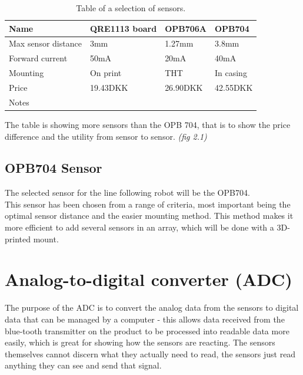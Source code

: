 \begin{table}[htbp]
    \begin{tabular}{|l|l|l|l|}
        \hline
        Name                & QRE1113 board & OPB706A  & OPB704    \\ \hline
        Max sensor distance & 3mm                            & 1.27mm   & 3.8mm     \\ \hline
        Forward current     & 50mA                           & 20mA     & 40mA      \\ \hline
        Mounting            & On print                       & THT      & In casing \\ \hline
        Price               & 19.43DKK                       & 26.90DKK & 42.55DKK  \\ \hline
        Notes               & ~                              & ~        & ~         \\
        \hline
    \end{tabular}
    \caption{Table of a selection of sensors.}
\label{sensor_table}
\end{table}
The table is showing more sensors than the OPB 704, that is to show the price difference and the utility from sensor to sensor. \emph{(fig 2.1)}



\subsection{OPB704 Sensor}
The selected sensor for the line following robot will be the OPB704.\\
This sensor has been chosen from a range of criteria, most important being the optimal sensor distance and the easier mounting method. This method makes it more efficient to add several sensors in an array, which will be done with a 3D-printed mount. 



\section{Analog-to-digital converter (ADC)}

The purpose of the ADC is to convert the analog data from the sensors to digital data that can be managed by a computer - this allows data received from the blue-tooth transmitter on the product to be processed into readable data more easily, which is great for showing how the sensors are reacting. The sensors themselves cannot discern what they actually need to read, the sensors just read anything they can see and send that signal.

